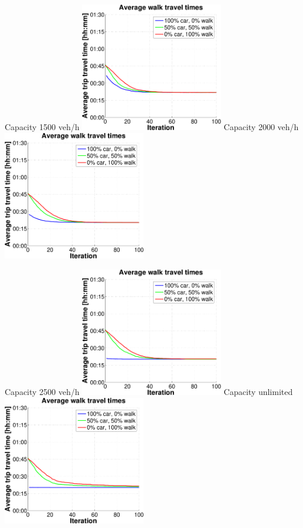 {  \createsubfigure%
  {Capacity 1500 veh/h}%
  {\includegraphics[width=0.47\textwidth, angle=0, trim=0mm 0mm 0mm 9mm, clip=true]{extending/figures/MultiModalSimulation/simulations/avg_walk_traveltime_1500}}%
  {\label{}}%
  {\hspace{3mm}}%
  \createsubfigure%
  {Capacity 2000 veh/h}%
  {\includegraphics[width=0.47\textwidth, angle=0, trim=0mm 0mm 0mm 9mm, clip=true]{extending/figures/MultiModalSimulation/simulations/avg_walk_traveltime_2000}}%
  {\label{}}%
  {\vspace{7.5mm}}%

  \createsubfigure%
  {Capacity 2500 veh/h}%
  {\includegraphics[width=0.47\textwidth, angle=0, trim=0mm 0mm 0mm 9mm, clip=true]{extending/figures/MultiModalSimulation/simulations/avg_walk_traveltime_2500}}%
  {\label{}}%
  {\hspace{3mm}}%
  \createsubfigure%
  {Capacity unlimited}%
  {\includegraphics[width=0.47\textwidth, angle=0, trim=0mm 0mm 0mm 9mm, clip=true]{extending/figures/MultiModalSimulation/simulations/avg_walk_traveltime_unlimited}}%
  {\label{}}%
  {}%
}%
